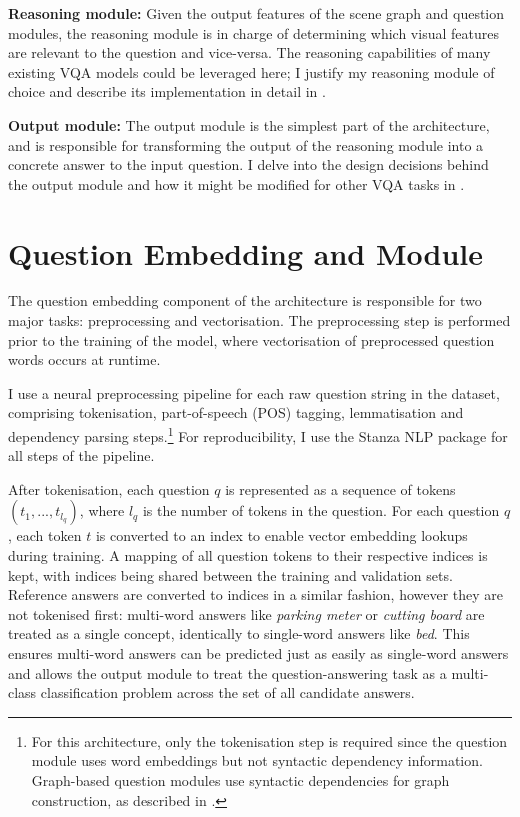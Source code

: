 \textbf{Reasoning module:} Given the output features of the scene graph and question modules, the reasoning module is in charge of determining which visual features are relevant to the question and vice-versa. The reasoning capabilities of many existing VQA models could be leveraged here; I justify my reasoning module of choice and describe its implementation in detail in \sectionautorefname{ \ref{section:reasoning_module}}.

\textbf{Output module:} The output module is the simplest part of the architecture, and is responsible for transforming the output of the reasoning module into a concrete answer to the input question. I delve into the design decisions behind the output module and how it might be modified for other VQA tasks in \sectionautorefname{ \ref{section:output_module}}.

\section{Question Embedding and Module}
\label{section:question_embedding_and_module}

The question embedding component of the architecture is responsible for two major tasks: preprocessing and vectorisation. The preprocessing step is performed prior to the training of the model, where vectorisation of preprocessed question words occurs at runtime. 

I use a neural preprocessing pipeline for each raw question string in the dataset, comprising tokenisation, part-of-speech (POS) tagging, lemmatisation and dependency parsing steps.\footnote{For this architecture, only the tokenisation step is required since the question module uses word embeddings but not syntactic dependency information. Graph-based question modules use syntactic dependencies for graph construction, as described in \subsectionautorefname{ \ref{subsec:question_module_ablations}}.} For reproducibility, I use the Stanza NLP package \cite{qi2020stanza} for all steps of the pipeline.

After tokenisation, each question \(q\) is represented as a sequence of tokens \((t_1, ..., t_{l_q})\), where \(l_q\) is the number of tokens in the question. For each question \(q\), each  token \(t\) is converted to an index to enable vector embedding lookups during training. A mapping of all question tokens to their respective indices is kept, with indices being shared between the training and validation sets. Reference answers are converted to indices in a similar fashion, however they are not tokenised first: multi-word answers like \textit{parking meter} or \textit{cutting board} are treated as a single concept, identically to single-word answers like \textit{bed}. This ensures  multi-word answers can be predicted just as easily as single-word answers and allows the output module to treat the question-answering task as a multi-class classification problem across the set of all candidate answers.

